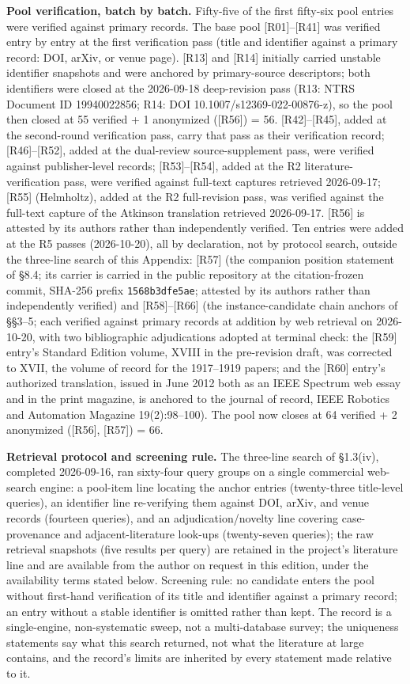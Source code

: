 \documentclass[11pt,a4paper]{article}
\begin{document}
\textbf{Pool verification, batch by batch.} Fifty-five of the first fifty-six pool entries were verified against primary records. The base pool [R01]–[R41] was verified entry by entry at the first verification pass (title and identifier against a primary record: DOI, arXiv, or venue page). [R13] and [R14] initially carried unstable identifier snapshots and were anchored by primary-source descriptors; both identifiers were closed at the 2026-09-18 deep-revision pass (R13: NTRS Document ID 19940022856; R14: DOI 10.1007/s12369-022-00876-z), so the pool then closed at 55 verified + 1 anonymized ([R56]) = 56. [R42]–[R45], added at the second-round verification pass, carry that pass as their verification record; [R46]–[R52], added at the dual-review source-supplement pass, were verified against publisher-level records; [R53]–[R54], added at the R2 literature-verification pass, were verified against full-text captures retrieved 2026-09-17; [R55] (Helmholtz), added at the R2 full-revision pass, was verified against the full-text capture of the Atkinson translation retrieved 2026-09-17. [R56] is attested by its authors rather than independently verified. Ten entries were added at the R5 passes (2026-10-20), all by declaration, not by protocol search, outside the three-line search of this Appendix: [R57] (the companion position statement of §8.4; its carrier is carried in the public repository at the citation-frozen commit, SHA-256 prefix \texttt{1568b3dfe5ae}; attested by its authors rather than independently verified) and [R58]–[R66] (the instance-candidate chain anchors of §§3–5; each verified against primary records at addition by web retrieval on 2026-10-20, with two bibliographic adjudications adopted at terminal check: the [R59] entry's Standard Edition volume, XVIII in the pre-revision draft, was corrected to XVII, the volume of record for the 1917–1919 papers; and the [R60] entry's authorized translation, issued in June 2012 both as an IEEE Spectrum web essay and in the print magazine, is anchored to the journal of record, IEEE Robotics and Automation Magazine 19(2):98–100). The pool now closes at 64 verified + 2 anonymized ([R56], [R57]) = 66.

\textbf{Retrieval protocol and screening rule.} The three-line search of §1.3(iv), completed 2026-09-16, ran sixty-four query groups on a single commercial web-search engine: a pool-item line locating the anchor entries (twenty-three title-level queries), an identifier line re-verifying them against DOI, arXiv, and venue records (fourteen queries), and an adjudication/novelty line covering case-provenance and adjacent-literature look-ups (twenty-seven queries); the raw retrieval snapshots (five results per query) are retained in the project's literature line and are available from the author on request in this edition, under the availability terms stated below. Screening rule: no candidate enters the pool without first-hand verification of its title and identifier against a primary record; an entry without a stable identifier is omitted rather than kept. The record is a single-engine, non-systematic sweep, not a multi-database survey; the uniqueness statements say what this search returned, not what the literature at large contains, and the record's limits are inherited by every statement made relative to it.
\end{document}
